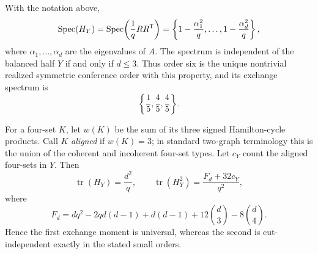 \begin{theorem}
\label{thm:balanced-exchange-rigidity}
With the notation above,
\[
 \operatorname{Spec}(H_Y)=\operatorname{Spec}\!\left(\frac1qRR^{\mathsf T}\right)
 =\left\{1-\frac{\alpha_1^2}{q},\ldots,
          1-\frac{\alpha_d^2}{q}\right\},
\]
where \(\alpha_1,\ldots,\alpha_d\) are the eigenvalues of \(A\).  The
spectrum is independent of the balanced half \(Y\) if and only if
\(d\leq3\).  Thus order six is the unique nontrivial realized symmetric
conference order with this property, and its exchange spectrum is
\[
 \left\{\frac15,\frac45,\frac45\right\}.
\]

For a four-set \(K\), let \(w(K)\) be the sum of its three signed
Hamilton-cycle products.  Call \(K\) \emph{aligned} if \(w(K)=3\); in
standard two-graph terminology this is the union of the coherent and
incoherent four-set types.  Let \(c_Y\) count the aligned four-sets in
\(Y\).  Then
\[
 \operatorname{tr}(H_Y)=\frac{d^2}{q},\qquad
 \operatorname{tr}(H_Y^2)=\frac{F_d+32c_Y}{q^2},
\]
where
\[
 F_d=dq^2-2qd(d-1)+d(d-1)+12\binom d3-8\binom d4.
\]
Hence the first exchange moment is universal, whereas the second is
cut-independent exactly in the stated small orders.
\end{theorem}

